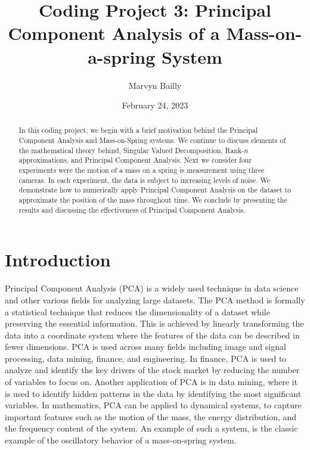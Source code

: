 \documentclass[12pt]{article}%
\begin{document}
\title{Coding Project 3:  Principal Component Analysis of a Mass-on-a-spring System}

\author{Marvyn Bailly}
\date{February 24, 2023}

\maketitle


\begin{abstract}
In this coding project, we begin with a brief motivation behind the Principal Component Analysis and Mass-on-Spring systems. We continue to discuss elements of the mathematical theory behind, Singular Valued Decomposition, Rank-$n$ approximations, and Principal Component Analysis. Next we consider four experiments were the motion of a mass on a spring is measurement using three cameras. In each experiment, the data is subject to increasing levels of noise. We demonstrate how to numerically apply Principal Component Analysis on the dataset to approximate the position of the mass throughout time. We conclude by presenting the results and discussing the effectiveness of Principal Component Analysis. 
\end{abstract}


\section{Introduction}
\label{Sec: Intro}

Principal Component Analysis (PCA) is a widely used technique in data science and other various fields for analyzing large datasets. The PCA method is formally a statistical technique that reduces the dimensionality of a dataset while preserving the essential information. This is achieved by linearly transforming the data into a coordinate system where the features of the data can be described in fewer dimensions. PCA is used across many fields including image and signal processing, data mining, finance, and engineering. In finance, PCA is used to analyze and identify the key drivers of the stock market by reducing the number of variables to focus on. Another application of PCA is in data mining, where it is used to identify hidden patterns in the data by identifying the most significant variables. In mathematics, PCA can be applied to dynamical systems, to capture important features such as the motion of the mass, the energy distribution, and the frequency content of the system. An example of such a system, is the classic example of the oscillatory behavior of a mass-on-spring system.
\end{document}
